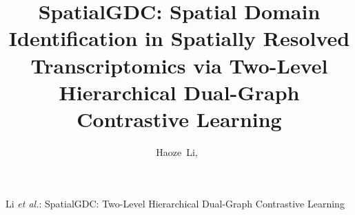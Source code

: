 \documentclass[lettersize,journal]{IEEEtran}
\begin{document}
\title{SpatialGDC: Spatial Domain Identification in Spatially Resolved Transcriptomics via Two-Level Hierarchical Dual-Graph Contrastive Learning}

\author{Haoze~Li,~
}

%
{Li \MakeLowercase{\textit{et al.}}: SpatialGDC: Two-Level Hierarchical Dual-Graph Contrastive Learning}

\maketitle
\end{document}
